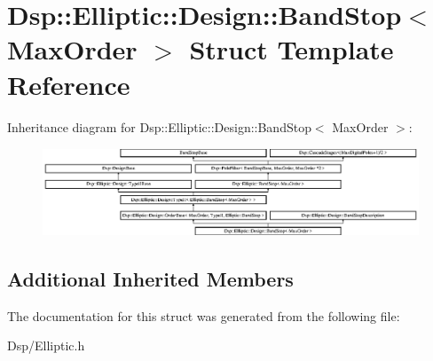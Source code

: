 \hypertarget{structDsp_1_1Elliptic_1_1Design_1_1BandStop}{\section{Dsp\-:\-:Elliptic\-:\-:Design\-:\-:Band\-Stop$<$ Max\-Order $>$ Struct Template Reference}
\label{structDsp_1_1Elliptic_1_1Design_1_1BandStop}
}
Inheritance diagram for Dsp\-:\-:Elliptic\-:\-:Design\-:\-:Band\-Stop$<$ Max\-Order $>$\-:\begin{figure}[H]
\begin{center}
\leavevmode
\includegraphics[height=2.610723cm]{structDsp_1_1Elliptic_1_1Design_1_1BandStop}
\end{center}
\end{figure}
\subsection*{Additional Inherited Members}


The documentation for this struct was generated from the following file\-:\begin{DoxyCompactItemize}
\item 
Dsp/Elliptic.\-h\end{DoxyCompactItemize}
